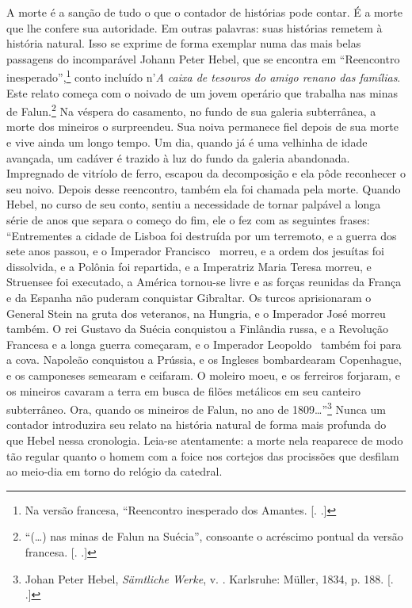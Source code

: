 A morte é a sanção de tudo o que o contador de histórias pode contar. É
a morte que lhe confere sua autoridade. Em outras palavras: suas
histórias remetem à história natural. Isso se exprime de forma exemplar
numa das mais belas passagens do incomparável Johann Peter Hebel, que se
encontra em ``Reencontro inesperado'',\footnote{Na versão francesa,
  ``Reencontro inesperado dos Amantes. [. .]} conto
incluído n'\emph{A caixa de tesouros do amigo renano das famílias}. Este
relato começa com o noivado de um jovem operário que trabalha nas minas
de Falun.\footnote{``(\ldots{}) nas minas de Falun na Suécia'', consoante o
  acréscimo pontual da versão francesa. [. .]} Na véspera do
casamento, no fundo de sua galeria subterrânea, a morte dos mineiros o
surpreendeu. Sua noiva permanece fiel depois de sua morte e vive ainda
um longo tempo. Um dia, quando já é uma velhinha de idade avançada, um
cadáver é trazido à luz do fundo da galeria abandonada. Impregnado de
vitríolo de ferro, escapou da decomposição e ela pôde reconhecer o seu
noivo. Depois desse reencontro, também ela foi chamada pela morte.
Quando Hebel, no curso de seu conto, sentiu a necessidade de tornar
palpável a longa série de anos que separa o começo do fim, ele o fez com
as seguintes frases: ``Entrementes a cidade de Lisboa foi destruída por
um terremoto, e a guerra dos sete anos passou, e o Imperador Francisco~
morreu, e a ordem dos jesuítas foi dissolvida, e a Polônia foi
repartida, e a Imperatriz Maria Teresa morreu, e Struensee foi
executado, a América tornou-se livre e as forças reunidas da França e da
Espanha não puderam conquistar Gibraltar. Os turcos aprisionaram o
General Stein na gruta dos veteranos, na Hungria, e o Imperador José
morreu também. O rei Gustavo da Suécia conquistou a Finlândia russa, e a
Revolução Francesa e a longa guerra começaram, e o Imperador Leopoldo~
também foi para a cova. Napoleão conquistou a Prússia, e os Ingleses
bombardearam Copenhague, e os camponeses semearam e ceifaram. O moleiro
moeu, e os ferreiros forjaram, e os mineiros cavaram a terra em busca de
filões metálicos em seu canteiro subterrâneo. Ora, quando os mineiros de
Falun, no ano de 1809\ldots{}''\footnote{Johan Peter Hebel, \emph{Sämtliche
  Werke}, v. . Karlsruhe: Müller, 1834, p. 188. [. .]}
Nunca um contador introduzira seu relato na história natural de forma
mais profunda do que Hebel nessa cronologia. Leia-se atentamente: a
morte nela reaparece de modo tão regular quanto o homem com a foice nos
cortejos das procissões que desfilam ao meio-dia em torno do relógio da
catedral.


